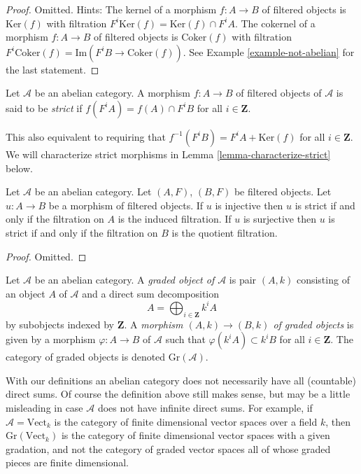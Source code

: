 \begin{proof}
Omitted. Hints: The kernel of a morphism $f : A \to B$ of filtered
objects is $\text{Ker}(f)$ with filtration
$F^i\text{Ker}(f) = \text{Ker}(f) \cap F^iA$.
The cokernel of a morphism $f : A \to B$ of filtered
objects is $\text{Coker}(f)$ with filtration
$F^i\text{Coker}(f) = \text{Im}(F^iB \to \text{Coker}(f))$.
See Example \ref{example-not-abelian} for the last statement.
\end{proof}

\begin{definition}
\label{definition-strict}
Let $\mathcal{A}$ be an abelian category.
A morphism $f : A \to B$ of filtered objects of $\mathcal{A}$ is
said to be {\it strict} if $f(F^iA) = f(A) \cap F^iB$ for
all $i \in \mathbf{Z}$.
\end{definition}

\noindent
This also equivalent to requiring that $f^{-1}(F^iB) = F^iA + \text{Ker}(f)$
for all $i \in \mathbf{Z}$. We will characterize strict morphisms in
Lemma \ref{lemma-characterize-strict} below.

\begin{lemma}
\label{lemma-induced-and-quotient-strict}
Let $\mathcal{A}$ be an abelian category.
Let $(A, F)$, $(B, F)$ be filtered objects.
Let $u : A \to B$ be a morphism of filtered objects.
If $u$ is injective then $u$ is strict if and only if the filtration
on $A$ is the induced filtration.
If $u$ is surjective then $u$ is strict if and only if the filtration
on $B$ is the quotient filtration.
\end{lemma}

\begin{proof}
Omitted.
\end{proof}

\begin{definition}
\label{definition-graded}
Let $\mathcal{A}$ be an abelian category.
A {\it graded object of $\mathcal{A}$} is
pair $(A, k)$ consisting of an object $A$ of $\mathcal{A}$
and a direct sum decomposition
$$
A = \bigoplus\nolimits_{i \in \mathbf{Z}} k^iA
$$
by subobjects indexed by $\mathbf{Z}$.
A {\it morphism $(A, k) \to (B, k)$ of graded objects}
is given by a morphism $\varphi : A \to B$ of $\mathcal{A}$
such that $\varphi(k^iA) \subset k^iB$ for all $i \in \mathbf{Z}$.
The category of graded objects is denoted $\text{Gr}(\mathcal{A})$.
\end{definition}

\noindent
With our definitions an abelian category does not necessarily have
all (countable) direct sums. Of course the definition above still
makes sense, but may be a little misleading in case $\mathcal{A}$
does not have infinite direct sums. For example, if
$\mathcal{A} = \text{Vect}_k$ is the category of finite dimensional vector
spaces over a field $k$, then $\text{Gr}(\text{Vect}_k)$ is the category
of finite dimensional vector spaces with a given gradation,
and not the category of graded vector spaces all of whose graded
pieces are finite dimensional.


